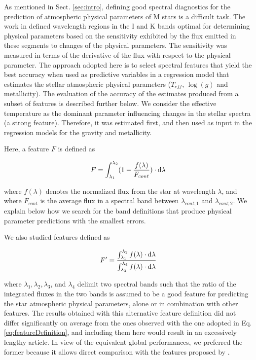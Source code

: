 As mentioned in Sect. \ref{sec:intro}, defining good spectral
diagnostics for the prediction of atmospheric physical parameters of M
stars is a difficult task. The work in \cite{cesetti} defined
wavelength regions in the I and K bands optimal for determining
physical parameters based on the sensitivity exhibited by the flux
emitted in these segments to changes of the physical parameters. The
sensitivity was measured in terms of the derivative of the flux with
respect to the physical parameter. The approach adopted here is to
select spectral features that yield the best accuracy when used as
predictive variables in a regression model that estimates the stellar
atmospheric physical parameters ($T_{eff}$, $\log(g)$ and
metallicity). The evaluation of the accuracy of the estimates produced
from a subset of features is described further below.  We consider the
effective temperature as the dominant parameter influencing changes in
the stellar spectra (a strong feature). Therefore, it was estimated
first, and then used as input in the regression models for the gravity
and metallicity.

Here, a feature $F$ is defined as

\begin{equation}\label{eq:featureDefinition}
  F = \int_{\lambda_{1}}^{\lambda_{2}} (1-\frac{f(\lambda)}{F_{cont}}) \cdot {\rm d}{\lambda}
\end{equation}

\zeroindent{}
where $f(\lambda)$ denotes the normalized flux from the star at
wavelength $\lambda$, and where $F_{cont}$ is the average flux in a
spectral band between $\lambda_{cont;1}$ and $\lambda_{cont;2}$. We
explain below how we search for the band definitions that produce
physical parameter predictions with the smallest errors.

We also studied features defined as

\begin{equation}\label{eq:feature2}
  F' = \frac{ \int_{\lambda_{1}}^{\lambda_{2}}f(\lambda) \cdot {\rm d}{\lambda}}
               {\int_{\lambda_{3}}^{\lambda_{4}} f(\lambda) \cdot {\rm d}{\lambda}} 
\end{equation}

\zeroindent{}
where $\lambda_1, \lambda_2, \lambda_3$, and $\lambda_4$ delimit two
spectral bands such that the ratio of the integrated fluxes in the two
bands is assumed to be a good feature for predicting the star 
atmospheric physical parameters, alone or in combination with other 
features. The results obtained with this alternative feature
definition did not differ significantly on average from the ones
observed with the one adopted in Eq. \ref{eq:featureDefinition}, and
including them here would result in an excessively lengthy article. In
view of the equivalent global performances, we preferred the former
because it allows direct comparison with the features proposed
by \cite{cesetti}.

